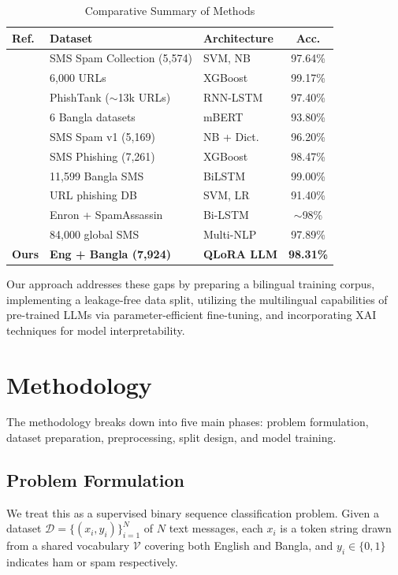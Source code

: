\documentclass[journal]{IEEEtran}
\begin{document}
\begin{table}[htbp]
\caption{Comparative Summary of Methods}
\label{tab:comparative}
\centering
\begin{tabular}{lllc}
\toprule
\textbf{Ref.} & \textbf{Dataset} & \textbf{Architecture} & \textbf{Acc.} \\
\midrule
\cite{ref1} & SMS Spam Collection (5,574) & SVM, NB & 97.64\% \\
\cite{ref2} & 6,000 URLs & XGBoost & 99.17\% \\
\cite{ref3} & PhishTank ($\sim$13k URLs) & RNN-LSTM & 97.40\% \\
\cite{ref4} & 6 Bangla datasets & mBERT & 93.80\% \\
\cite{ref5} & SMS Spam v1 (5,169) & NB + Dict. & 96.20\% \\
\cite{ref6} & SMS Phishing (7,261) & XGBoost & 98.47\% \\
\cite{ref7} & 11,599 Bangla SMS & BiLSTM & 99.00\% \\
\cite{ref8} & URL phishing DB & SVM, LR & 91.40\% \\
\cite{ref9} & Enron + SpamAssassin & Bi-LSTM & $\sim$98\% \\
\cite{ref10} & 84,000 global SMS & Multi-NLP & 97.89\% \\
\textbf{Ours} & \textbf{Eng + Bangla (7,924)} & \textbf{QLoRA LLM} & \textbf{98.31\%} \\
\bottomrule
\end{tabular}
\end{table}

Our approach addresses these gaps by preparing a bilingual training corpus, implementing a leakage-free data split, utilizing the multilingual capabilities of pre-trained LLMs via parameter-efficient fine-tuning, and incorporating XAI techniques for model interpretability.

\section{Methodology}

The methodology breaks down into five main phases: problem formulation, dataset preparation, preprocessing, split design, and model training.

\subsection{Problem Formulation}

We treat this as a supervised binary sequence classification problem. Given a dataset $\mathcal{D} = \{(x_i, y_i)\}_{i=1}^{N}$ of $N$ text messages, each $x_i$ is a token string drawn from a shared vocabulary $\mathcal{V}$ covering both English and Bangla, and $y_i \in \{0, 1\}$ indicates ham or spam respectively.
\end{document}
